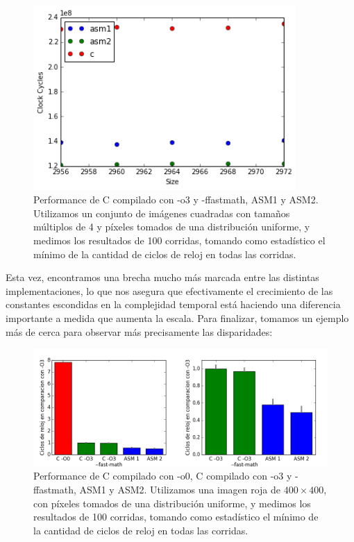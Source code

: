 \begin{figure}[!hbt] 
	\centering
  \includegraphics[width=10cm]{blur-imagenes-grandes.png}
  \caption{Performance de C compilado con -o3 y -ffastmath, ASM1 y ASM2. Utilizamos un conjunto de imágenes cuadradas con tamaños múltiplos de 4 y píxeles tomados de una distribución uniforme, y medimos los resultados de 100 corridas, tomando como estadístico el mínimo de la cantidad de ciclos de reloj en todas las corridas.}
\end{figure}

Esta vez, encontramos una brecha mucho más marcada entre las distintas implementaciones, lo que nos asegura que efectivamente el crecimiento de las constantes escondidas en la complejidad temporal está haciendo una diferencia importante a medida que aumenta la escala. Para finalizar, tomamos un ejemplo más de cerca para observar más precisamente las disparidades:

\begin{figure}[!hbt] 
	\centering
  \includegraphics[width=17cm]{blur-all.png}
  \caption{Performance de C compilado con -o0, C compilado con -o3 y -ffastmath, ASM1 y ASM2. Utilizamos una imagen roja de $400 \times 400$, con píxeles tomados de una distribución uniforme, y medimos los resultados de 100 corridas, tomando como estadístico el mínimo de la cantidad de ciclos de reloj en todas las corridas.}
\end{figure}


